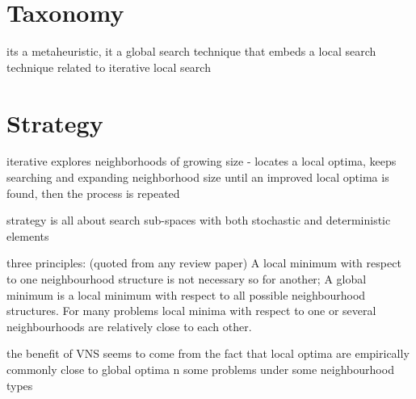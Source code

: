 \documentclass[a4paper, 11pt]{article}
\begin{document}
\section{Taxonomy}
\label{sec:taxonomy}
its a metaheuristic, it a global search technique that embeds a local search technique
related to iterative local search

\section{Strategy}
\label{sec:strategy}

iterative explores neighborhoods of growing size - locates a local optima, keeps searching and expanding neighborhood size until an improved local optima is found, then the process is repeated

strategy is all about search sub-spaces with both stochastic and deterministic elements

three principles: (quoted from any review paper) A local minimum with respect to one neighbourhood structure is not necessary so for another; A global minimum is a local minimum with respect to all possible neighbourhood structures.  For many problems local minima with respect to one or several neighbourhoods are relatively close to each other.

the benefit of VNS seems to come from the fact that local optima are empirically commonly close to global optima n some problems under some neighbourhood types 
\end{document}
